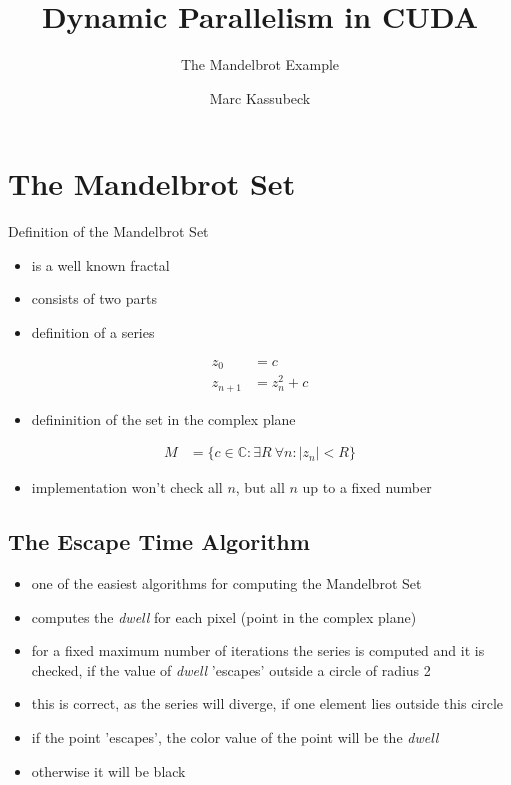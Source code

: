 \documentclass[fleqn,11pt,aspectratio=43]{beamer}
\title{Dynamic Parallelism in CUDA}
\subtitle{The Mandelbrot Example}
\author{Marc Kassubeck}
\begin{document}
\begin{frame}[plain]
\titlepage
\end{frame}

\begin{frame}[plain]
  \tableofcontents
\end{frame}


\section{The Mandelbrot Set}

\begin{frame}{Definition of the Mandelbrot Set}
	\begin{itemize}
		\item is a well known fractal
		\item consists of two parts
		\item definition of a series
	\end{itemize}	
	\begin{align*}
		z_0 &= c\\
		z_{n+1} &= z_n^2 + c
	\end{align*}
	\begin{itemize}
		\item defininition of the set in the complex plane
	\end{itemize}
	\begin{align*}
		M &= \{c \in \mathbb{C}: \exists R\ \forall n: \left| z_n \right| < R \}
	\end{align*}
	\begin{itemize}
		\item implementation won't check all $n$, but all $n$ up to a fixed number
	\end{itemize}
\end{frame}

\subsection{The Escape Time Algorithm}

\begin{frame}
	\begin{itemize}
		\item one of the easiest algorithms for computing the Mandelbrot Set
		\item computes the \textit{dwell} for each pixel (point in the complex plane)
		\item for a fixed maximum number of iterations the series is computed and it is checked, if the value of \textit{dwell} 'escapes' outside a circle of radius 2
		\item this is correct, as the series will diverge, if one element lies outside this circle
		\item if the point 'escapes', the color value of the point will be the \textit{dwell}
		\item otherwise it will be black
	\end{itemize}
\end{frame}
\end{document}
